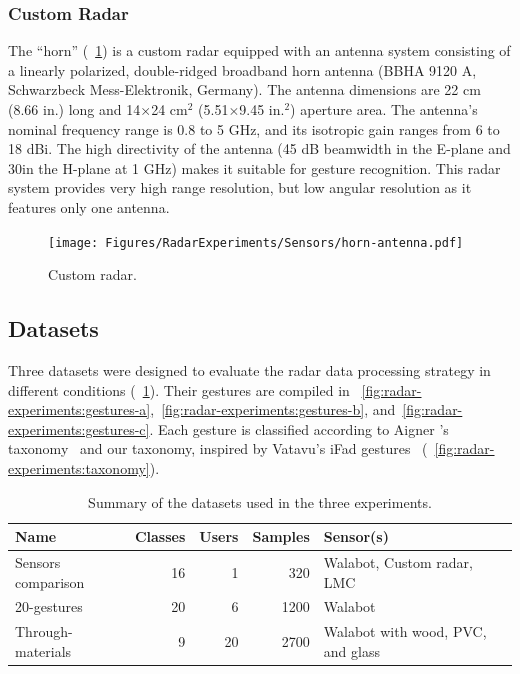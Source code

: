 \subsubsection{Custom Radar}
The ``horn'' (\fig~\ref{fig:radar-experiments:horn}) is a custom radar equipped with an antenna system consisting of a linearly polarized, double-ridged broadband horn antenna (BBHA 9120 A, Schwarzbeck Mess-Elektronik, Germany). The antenna dimensions are 22 cm (8.66 in.) long and 14$\times$24 cm$^2$ (5.51$\times$9.45 in.$^2$) aperture area. The antenna's nominal frequency range is 0.8 to 5 GHz, and its isotropic gain ranges from 6 to 18 dBi. The high directivity of the antenna (45 dB beamwidth in the E-plane and 30\textdegree in the H-plane at 1 GHz) makes it suitable for gesture recognition.
This radar system provides very high range resolution, but low angular resolution as it features only one antenna.

\begin{figure}[!h]
    \centering
    \texttt{[image: Figures/RadarExperiments/Sensors/horn-antenna.pdf]}
    \caption{Custom radar.}
    \label{fig:radar-experiments:horn}
\end{figure}


\subsection{Datasets} \label{sec:radar-experiments:data-collection:datasets}
Three datasets were designed to evaluate the radar data processing strategy in different conditions (\tab~\ref{tab:radar-experiments:datasets-summary}). Their gestures are compiled in \fig~\ref{fig:radar-experiments:gestures-a},~\ref{fig:radar-experiments:gestures-b}, and~\ref{fig:radar-experiments:gestures-c}. Each gesture is classified according to Aigner \etal's taxonomy~\cite{Aigner:2012} and our taxonomy, inspired by Vatavu's iFad gestures~\cite{Vatavu:2023b} (\fig~\ref{fig:radar-experiments:taxonomy}).

\begin{table}[!b]
    \footnotesize
    \centering
    \begin{tabular}{lrrrp{4.6cm}}
        \toprule
        \textbf{Name} & \textbf{Classes} & \textbf{Users} & \textbf{Samples} & \textbf{Sensor(s)} \\
        \midrule
        Sensors comparison & 16 & 1 & 320 & Walabot, Custom radar, LMC\\
        20-gestures & 20 & 6 & 1200 & Walabot \\
        Through-materials & 9 & 20 & 2700 & Walabot with wood, PVC, and glass \\
        \bottomrule
    \end{tabular}
    \caption{Summary of the datasets used in the three experiments.}
    \label{tab:radar-experiments:datasets-summary}
\end{table}


